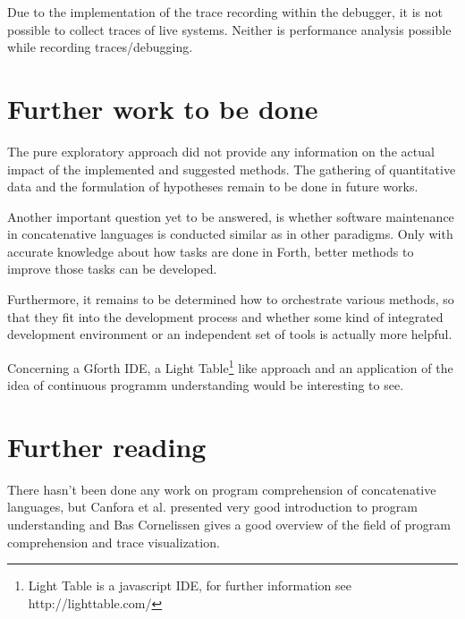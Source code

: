 Due to the implementation of the trace recording within the debugger, it is not possible to collect traces of live systems. Neither is performance analysis possible while recording traces/debugging.
 

\section{Further work to be done}

The pure exploratory approach did not provide any information on the actual impact of the implemented and suggested methods. The gathering of quantitative data and the formulation of hypotheses remain to be done in future works.

Another important question yet to be answered, is whether software maintenance in concatenative languages is conducted similar as in other paradigms. Only with accurate knowledge about how tasks are done in Forth, better methods to improve those tasks can be developed.

Furthermore, it remains to be determined how to orchestrate various methods, so that they fit into the development process and whether some kind of integrated development environment or an independent set of tools is actually more helpful.

Concerning a Gforth IDE, a Light Table\footnote{Light Table is a javascript IDE, for further information see http://lighttable.com/} like approach and an application of the idea of continuous programm understanding\cite{Muller:2000:RER:336512.336526} would be interesting to see.


\section{Further reading}

There hasn't been done any work on program comprehension of concatenative languages, but Canfora et al.\cite{Canfora:2011:ACS:1924421.1924451} presented very good introduction to program understanding and Bas Cornelissen\cite{Cornelissen2009} gives a good overview of the field of program comprehension and trace visualization.